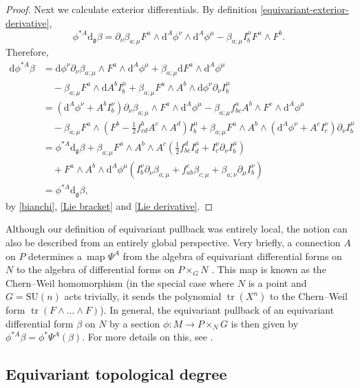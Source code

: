\documentclass[pdftex]{sigma}
\newcommand{\g}{{\mathfrak{g}}}
\newcommand{\SU}{{\mathrm{SU}}}
\newcommand{\1}{{\mathbb{1}}}
\def \d{\mathrm{d}}
\newcommand{\tr}{{\operatorname{tr}}}
\numberwithin{equation}{section}
\begin{document}
\begin{proof}
Next we calculate exterior differentials. By definition \eqref{equivariant-exterior-derivative},
\begin{equation*}
\phi^{\ast A}\d_\g\beta = \partial_\nu\beta_{a;\mu}F^a\wedge \d^A\phi^\nu\wedge \d^A\phi^\mu - \beta_{a;\mu}I_b^\mu F^a\wedge F^b.
\end{equation*}
Therefore,
\begin{align*}
\d\phi^{\ast A}\beta &=\d\phi^\nu\partial_\nu\beta_{a;\mu}\wedge F^a\wedge \d^A\phi^\mu + \beta_{a;\mu}\d F^a\wedge \d^A\phi^\mu \nonumber\\
&\quad -\beta_{a;\mu}F^a\wedge\d A^b I_b^\mu + \beta_{a;\mu}F^a\wedge A^b\wedge \d\phi^\nu\partial_\nu I_b^\mu \\
&= (\d^A\phi^\nu+A^bI_b^\nu)\partial_\nu\beta_{a;\mu}\wedge F^a\wedge \d^A\phi^\mu
- \beta_{a;\mu}f^a_{bc}A^b\wedge F^c\wedge \d^A\phi^\mu \nonumber\\
&\quad -\beta_{a;\mu}F^a\wedge (F^b-\tfrac12 f^b_{cd}A^c\wedge A^d) I_b^\mu
+ \beta_{a;\mu}F^a\wedge A^b\wedge (\d^A\phi^\nu+A^cI_c^\nu) \partial_\nu I_b^\mu \\
&= \phi^{\ast A}\d_\g \beta + \beta_{a;\mu}F^a\wedge A^b\wedge A^c (\tfrac12 f_{bc}^dI_d^\mu +I_c^\nu\partial_\nu I_b^\mu) \nonumber \\
&\quad+ F^a\wedge A^b\wedge \d^A\phi^\mu (I_b^\nu\partial_\nu\beta_{a;\mu}+f_{ab}^c\beta_{c;\mu} +\beta_{a;\nu}\partial_\mu I_b^\nu )\\
&= \phi^{\ast A}\d_\g \beta,
\end{align*}
by \eqref{bianchi}, \eqref{Lie bracket} and \eqref{Lie derivative}.
\end{proof}

Although our definition of equivariant pullback was entirely local, the notion can also be described from an entirely global perspective. Very briefly, a connection $A$ on $P$ determines a~map $\Psi^A$ from the algebra of equivariant differential forms on $N$ to the algebra of differential forms on $P\times_GN$ \cite{berlineGetzlerVergne2003}. This map is known as the Chern--Weil homomorphism (in the special case where $N$ is a point and $G=\SU(n)$ acts trivially, it sends the polynomial $\tr(X^n)$ to the Chern--Weil form $\tr(F\wedge\dots\wedge F)$). In general, the equivariant pullback of an equivariant differential form $\beta$ on $N$ by a section $\phi\colon M\to P\times_N G$ is then given by $\phi^{\ast A}\beta = \phi^\ast \Psi^A(\beta)$. For more details on this, see \cite{berlineGetzlerVergne2003}.

\subsection{Equivariant topological degree}%
\end{document}
